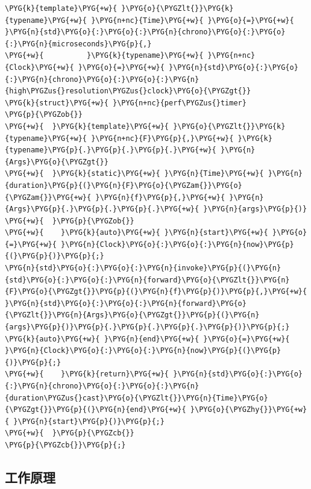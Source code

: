 
\begin{codeblockbg}
\begin{Verbatim}[commandchars=\\\{\},breaklines=true,breakanywhere=true,fontsize=\codefont,xleftmargin=17bp]
\PYG{k}{template}\PYG{+w}{ }\PYG{o}{\PYGZlt{}}\PYG{k}{typename}\PYG{+w}{ }\PYG{n+nc}{Time}\PYG{+w}{ }\PYG{o}{=}\PYG{+w}{ }\PYG{n}{std}\PYG{o}{:}\PYG{o}{:}\PYG{n}{chrono}\PYG{o}{:}\PYG{o}{:}\PYG{n}{microseconds}\PYG{p}{,}
\PYG{+w}{          }\PYG{k}{typename}\PYG{+w}{ }\PYG{n+nc}{Clock}\PYG{+w}{ }\PYG{o}{=}\PYG{+w}{ }\PYG{n}{std}\PYG{o}{:}\PYG{o}{:}\PYG{n}{chrono}\PYG{o}{:}\PYG{o}{:}\PYG{n}{high\PYGZus{}resolution\PYGZus{}clock}\PYG{o}{\PYGZgt{}}
\PYG{k}{struct}\PYG{+w}{ }\PYG{n+nc}{perf\PYGZus{}timer}
\PYG{p}{\PYGZob{}}
\PYG{+w}{  }\PYG{k}{template}\PYG{+w}{ }\PYG{o}{\PYGZlt{}}\PYG{k}{typename}\PYG{+w}{ }\PYG{n+nc}{F}\PYG{p}{,}\PYG{+w}{ }\PYG{k}{typename}\PYG{p}{.}\PYG{p}{.}\PYG{p}{.}\PYG{+w}{ }\PYG{n}{Args}\PYG{o}{\PYGZgt{}}
\PYG{+w}{  }\PYG{k}{static}\PYG{+w}{ }\PYG{n}{Time}\PYG{+w}{ }\PYG{n}{duration}\PYG{p}{(}\PYG{n}{F}\PYG{o}{\PYGZam{}}\PYG{o}{\PYGZam{}}\PYG{+w}{ }\PYG{n}{f}\PYG{p}{,}\PYG{+w}{ }\PYG{n}{Args}\PYG{p}{.}\PYG{p}{.}\PYG{p}{.}\PYG{+w}{ }\PYG{n}{args}\PYG{p}{)}
\PYG{+w}{  }\PYG{p}{\PYGZob{}}
\PYG{+w}{    }\PYG{k}{auto}\PYG{+w}{ }\PYG{n}{start}\PYG{+w}{ }\PYG{o}{=}\PYG{+w}{ }\PYG{n}{Clock}\PYG{o}{:}\PYG{o}{:}\PYG{n}{now}\PYG{p}{(}\PYG{p}{)}\PYG{p}{;}
\PYG{n}{std}\PYG{o}{:}\PYG{o}{:}\PYG{n}{invoke}\PYG{p}{(}\PYG{n}{std}\PYG{o}{:}\PYG{o}{:}\PYG{n}{forward}\PYG{o}{\PYGZlt{}}\PYG{n}{F}\PYG{o}{\PYGZgt{}}\PYG{p}{(}\PYG{n}{f}\PYG{p}{)}\PYG{p}{,}\PYG{+w}{ }\PYG{n}{std}\PYG{o}{:}\PYG{o}{:}\PYG{n}{forward}\PYG{o}{\PYGZlt{}}\PYG{n}{Args}\PYG{o}{\PYGZgt{}}\PYG{p}{(}\PYG{n}{args}\PYG{p}{)}\PYG{p}{.}\PYG{p}{.}\PYG{p}{.}\PYG{p}{)}\PYG{p}{;}
\PYG{k}{auto}\PYG{+w}{ }\PYG{n}{end}\PYG{+w}{ }\PYG{o}{=}\PYG{+w}{ }\PYG{n}{Clock}\PYG{o}{:}\PYG{o}{:}\PYG{n}{now}\PYG{p}{(}\PYG{p}{)}\PYG{p}{;}
\PYG{+w}{    }\PYG{k}{return}\PYG{+w}{ }\PYG{n}{std}\PYG{o}{:}\PYG{o}{:}\PYG{n}{chrono}\PYG{o}{:}\PYG{o}{:}\PYG{n}{duration\PYGZus{}cast}\PYG{o}{\PYGZlt{}}\PYG{n}{Time}\PYG{o}{\PYGZgt{}}\PYG{p}{(}\PYG{n}{end}\PYG{+w}{ }\PYG{o}{\PYGZhy{}}\PYG{+w}{ }\PYG{n}{start}\PYG{p}{)}\PYG{p}{;}
\PYG{+w}{  }\PYG{p}{\PYGZcb{}}
\PYG{p}{\PYGZcb{}}\PYG{p}{;}
\end{Verbatim}
\end{codeblockbg}



\subsection{工作原理}


